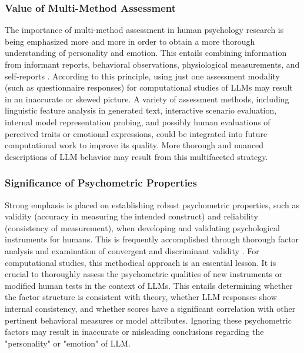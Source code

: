 \documentclass{DESSThesis}
\begin{document}
\subsubsection{Value of Multi-Method Assessment}
The importance of multi-method assessment in human psychology research is being emphasized more and more in order to obtain a more thorough understanding of personality and emotion. This entails combining information from informant reports, behavioral observations, physiological measurements, and self-reports \cite{paul_towards_2020,barsade_ripple_2002,nummenmaa_bodily_2014}. According to this principle, using just one assessment modality (such as questionnaire responses) for computational studies of LLMs may result in an inaccurate or skewed picture. A variety of assessment methods, including linguistic feature analysis in generated text, interactive scenario evaluation, internal model representation probing, and possibly human evaluations of perceived traits or emotional expressions, could be integrated into future computational work to improve its quality. More thorough and nuanced descriptions of LLM behavior may result from this multifaceted strategy.

\subsubsection{Significance of Psychometric Properties}
Strong emphasis is placed on establishing robust psychometric properties, such as validity (accuracy in measuring the intended construct) and reliability (consistency of measurement), when developing and validating psychological instruments for humans. This is frequently accomplished through thorough factor analysis and examination of convergent and discriminant validity \cite{johnson_measuring_2014,kajonius_assessing_2019,maples_test_2014,okeefe_introducing_2012}. For computational studies, this methodical approach is an essential lesson. It is crucial to thoroughly assess the psychometric qualities of new instruments or modified human tests in the context of LLMs. This entails determining whether the factor structure is consistent with theory, whether LLM responses show internal consistency, and whether scores have a significant correlation with other pertinent behavioral measures or model attributes. Ignoring these psychometric factors may result in inaccurate or misleading conclusions regarding the "personality" or "emotion" of LLM.
\end{document}
